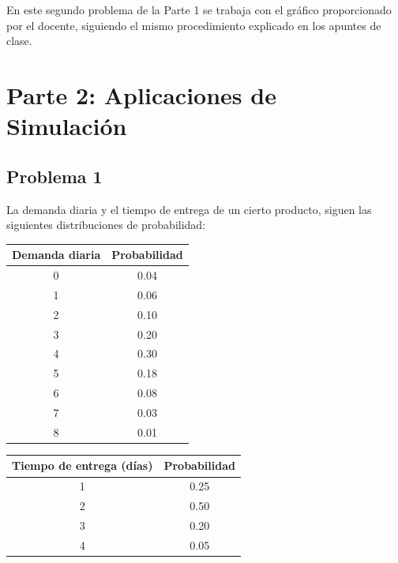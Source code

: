 \documentclass[12pt]{article}
\begin{document}
En este segundo problema de la Parte 1 se trabaja con el gráfico proporcionado por el docente, siguiendo el mismo procedimiento explicado en los apuntes de clase.

\begin{center}
\end{center}

\section{Parte 2: Aplicaciones de Simulación}

\subsection{Problema 1}

La demanda diaria y el tiempo de entrega de un cierto producto, siguen las siguientes distribuciones de probabilidad:

\begin{center}
\begin{tabular}{cc}
\toprule
Demanda diaria & Probabilidad \\
\midrule
0 & 0.04 \\
1 & 0.06 \\
2 & 0.10 \\
3 & 0.20 \\
4 & 0.30 \\
5 & 0.18 \\
6 & 0.08 \\
7 & 0.03 \\
8 & 0.01 \\
\bottomrule
\end{tabular}
\qquad
\begin{tabular}{cc}
\toprule
Tiempo de entrega (días) & Probabilidad \\
\midrule
1 & 0.25 \\
2 & 0.50 \\
3 & 0.20 \\
4 & 0.05 \\
\bottomrule
\end{tabular}
\end{center}
\end{document}
